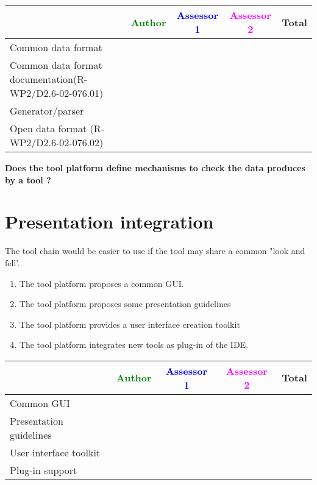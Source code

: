 \begin{tabular}{|l | c | c | c | c|} \hline
  & \textcolor{green}{Author} & \textcolor{blue}{Assessor 1} &  \textcolor{magenta}{Assessor 2} & Total \\
  \hline Common data format&
  &                 &                  &\\
  \hline Common data format documentation(R-WP2/D2.6-02-076.01) &
  &                 &                  &\\
  \hline Generator/parser &
  &                 &                  &\\
  \hline Open data format (R-WP2/D2.6-02-076.02)&
  &                 &                  &\\
  \hline
\end{tabular}

{\bf Does the tool platform define mechanisms to check the data produces
by a tool ?}

\section{Presentation integration}
The tool chain would be easier to use if the tool may share a common
"look and fell'.
\begin{enumerate}
\item The tool platform proposes a common \gls{GUI}.
\item The tool platform proposes some presentation guidelines
\item The tool platform provides a user interface creation toolkit
\item The tool platform integrates new tools as plug-in of the \gls{IDE}.
\end{enumerate}

\begin{tabular}{|l | c | c | c | c|} \hline
  & \textcolor{green}{Author} & \textcolor{blue}{Assessor 1} &  \textcolor{magenta}{Assessor 2} & Total \\
  \hline Common \gls{GUI}&
  &                 &                  &\\
  \hline Presentation guidelines &
  &                 &                  &\\
  \hline User interface toolkit &
  &                 &                  &\\
  \hline Plug-in support &
  &                 &                  &\\
  \hline
\end{tabular}



